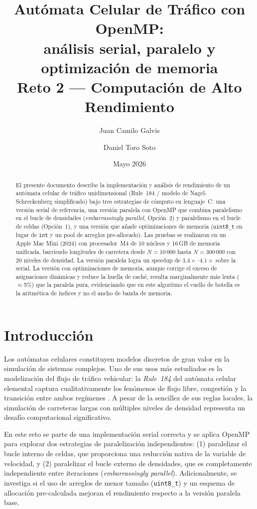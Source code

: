 \documentclass{article}
\title{Aut\'omata Celular de Tr\'afico con OpenMP:\\
       an\'alisis serial, paralelo y optimizaci\'on de memoria\\[0.5em]
\large Reto 2 --- Computaci\'on de Alto Rendimiento}
\author{Juan Camilo Galvis \and Daniel Toro Soto}
\date{Mayo 2026}
\begin{document}
\maketitle

\begin{abstract}
El presente documento describe la implementaci\'on y an\'alisis de rendimiento de un
aut\'omata celular de tr\'afico unidimensional (Rule~184 / modelo de
Nagel-Schreckenberg simplificado) bajo tres estrategias de c\'omputo en lenguaje~C:
una versi\'on serial de referencia, una versi\'on paralela con OpenMP que combina
paralelismo en el bucle de densidades (\emph{embarrassingly parallel}, Opci\'on~2) y
paralelismo en el bucle de celdas (Opci\'on~1), y una versi\'on que a\~nade
optimizaciones de memoria (\texttt{uint8\_t} en lugar de \texttt{int} y un pool de
arreglos pre-allocado). Las pruebas se realizaron en un Apple Mac Mini (2024) con
procesador~M4 de 10 n\'ucleos y 16\,GB de memoria unificada, barriendo longitudes de
carretera desde $N=10\,000$ hasta $N=300\,000$ con 20 niveles de densidad.
La versi\'on paralela logra un speedup de $3.4\times$--$4.1\times$ sobre la serial.
La versi\'on con optimizaciones de memoria, aunque corrige el exceso de asignaciones
din\'amicas y reduce la huella de cach\'e, resulta marginalmente m\'as lenta
($\approx$5\%) que la paralela pura, evidenciando que en este algoritmo el cuello de
botella es la aritm\'etica de \'indices y no el ancho de banda de memoria.
\end{abstract}

\tableofcontents
\newpage

\section{Introducci\'on}

Los aut\'omatas celulares constituyen modelos discretos de gran valor en la simulaci\'on
de sistemas complejos. Uno de sus usos m\'as estudiados es la modelizaci\'on del flujo de
tr\'afico vehicular: la \emph{Rule~184} del aut\'omata celular elemental captura
cualitativamente los fen\'omenos de flujo libre, congesti\'on y la transici\'on entre
ambos reg\'imenes \cite{trafficmodel}. A pesar de la sencillez de sus reglas locales, la
simulaci\'on de carreteras largas con m\'ultiples niveles de densidad representa un
desaf\'io computacional significativo.

En este reto se parte de una implementaci\'on serial correcta y se aplica OpenMP para
explorar dos estrategias de paralelizaci\'on independientes: (1) paralelizar el bucle
interno de celdas, que proporciona una reducci\'on nativa de la variable de velocidad, y
(2) paralelizar el bucle externo de densidades, que es completamente independiente entre
iteraciones (\emph{embarrassingly parallel}). Adicionalmente, se investiga si el uso de
arreglos de menor tama\~no (\texttt{uint8\_t}) y un esquema de allocaci\'on pre-calculada
mejoran el rendimiento respecto a la versi\'on paralela base.
\end{document}
